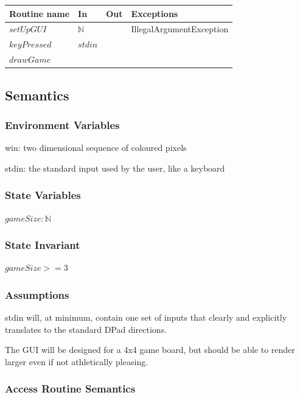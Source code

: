 \documentclass[12pt]{article}
\begin{document}
\begin{tabular}{| l | l | l | l |}
  \hline
  \textbf{Routine name} & \textbf{In}  & \textbf{Out} & \textbf{Exceptions}        \\
  \hline
  $setUpGUI$            & $\mathbb{N}$ &              & IllegalArgumentException \\
  \hline
  $keyPressed$          & $stdin$      &              &                            \\
  \hline
  $drawGame$            &              &              &                            \\
  \hline
\end{tabular}

\subsection* {Semantics}

\subsubsection* {Environment Variables}

win: two dimensional sequence of coloured pixels

\noindent stdin: the standard input used by the user, like a keyboard

\subsubsection* {State Variables}

$\mathit{gameSize}: \mathbb{N}$

\subsubsection* {State Invariant}

$gameSize >= 3$

\subsubsection* {Assumptions}

stdin will, at minimum, contain one set of inputs that clearly and explicitly translates to the standard DPad directions.

The GUI will be designed for a 4x4 game board, but should be able to render larger even if not athletically pleasing.

\subsubsection* {Access Routine Semantics}
\end{document}
